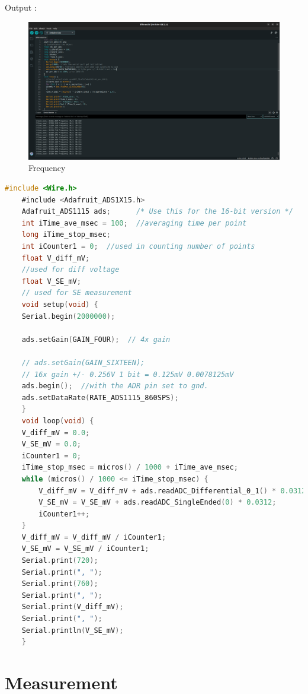 \documentclass[a4paper,11pt]{article}%
\begin{document}
Output :
\begin{figure}[!h]
	\centering
	\includegraphics[scale=0.25]{figures/readings.png}
	\caption{Frequency}
\end{figure}



\begin{lstlisting}[language=C]
	#include <Wire.h>
	#include <Adafruit_ADS1X15.h>
	Adafruit_ADS1115 ads;      /* Use this for the 16-bit version */
	int iTime_ave_msec = 100;  //averaging time per point
	long iTime_stop_msec;
	int iCounter1 = 0;  //used in counting number of points
	float V_diff_mV;
	//used for diff voltage
	float V_SE_mV;
	// used for SE measurement
	void setup(void) {
	Serial.begin(2000000);

	ads.setGain(GAIN_FOUR);  // 4x gain

	// ads.setGain(GAIN_SIXTEEN);
	// 16x gain +/- 0.256V 1 bit = 0.125mV 0.0078125mV
	ads.begin();  //with the ADR pin set to gnd.
	ads.setDataRate(RATE_ADS1115_860SPS);
	}
	void loop(void) {
	V_diff_mV = 0.0;
	V_SE_mV = 0.0;
	iCounter1 = 0;
	iTime_stop_msec = micros() / 1000 + iTime_ave_msec;
	while (micros() / 1000 <= iTime_stop_msec) {
		V_diff_mV = V_diff_mV + ads.readADC_Differential_0_1() * 0.0312;
		V_SE_mV = V_SE_mV + ads.readADC_SingleEnded(0) * 0.0312;
		iCounter1++;
	}
	V_diff_mV = V_diff_mV / iCounter1;
	V_SE_mV = V_SE_mV / iCounter1;
	Serial.print(720);
	Serial.print(", ");
	Serial.print(760);
	Serial.print(", ");
	Serial.print(V_diff_mV);
	Serial.print(", ");
	Serial.println(V_SE_mV);
	}

\end{lstlisting}





\section{Measurement}
\end{document}
